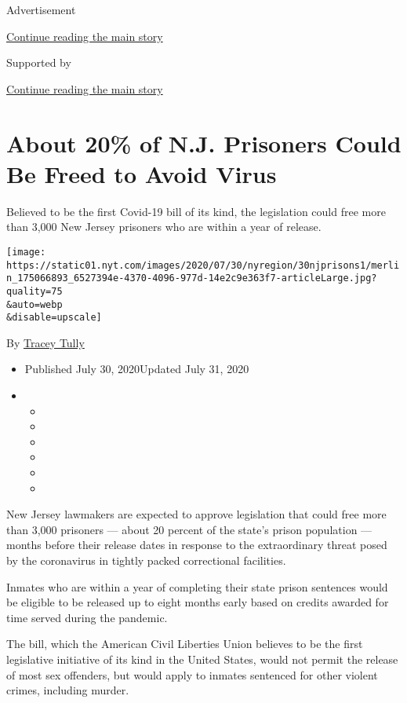 Advertisement

\protect\hyperlink{after-top}{Continue reading the main story}

Supported by

\protect\hyperlink{after-sponsor}{Continue reading the main story}

\hypertarget{about-20-of-nj-prisoners-could-be-freed-to-avoid-virus}{%
\section{About 20\% of N.J. Prisoners Could Be Freed to Avoid
Virus}\label{about-20-of-nj-prisoners-could-be-freed-to-avoid-virus}}

Believed to be the first Covid-19 bill of its kind, the legislation
could free more than 3,000 New Jersey prisoners who are within a year of
release.

\texttt{[image: https://static01.nyt.com/images/2020/07/30/nyregion/30njprisons1/merlin\_175066893\_6527394e-4370-4096-977d-14e2c9e363f7-articleLarge.jpg?quality=75\\\&auto=webp\\\&disable=upscale]}

By \href{https://www.nytimes.com/by/tracey-tully}{Tracey Tully}

\begin{itemize}
\item
  Published July 30, 2020Updated July 31, 2020
\item
  \begin{itemize}
  \item
  \item
  \item
  \item
  \item
  \item
  \end{itemize}
\end{itemize}

New Jersey lawmakers are expected to approve legislation that could free
more than 3,000 prisoners --- about 20 percent of the state's prison
population --- months before their release dates in response to the
extraordinary threat posed by the coronavirus in tightly packed
correctional facilities.

Inmates who are within a year of completing their state prison sentences
would be eligible to be released up to eight months early based on
credits awarded for time served during the pandemic.

The bill, which the American Civil Liberties Union believes to be the
first legislative initiative of its kind in the United States, would not
permit the release of most sex offenders, but would apply to inmates
sentenced for other violent crimes, including murder.

